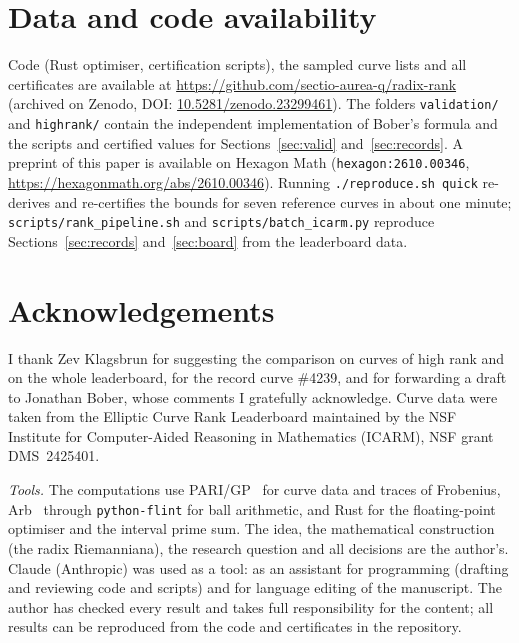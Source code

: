 \documentclass[11pt]{amsart}
\theoremstyle{remark}
\theoremstyle{definition}
\begin{document}
\section*{Data and code availability}
Code (Rust optimiser, certification scripts), the sampled curve lists and all certificates are available at \url{https://github.com/sectio-aurea-q/radix-rank} (archived on Zenodo, DOI: \href{https://doi.org/10.5281/zenodo.23299461}{10.5281/zenodo.23299461}). The folders \texttt{validation/} and \texttt{highrank/} contain the independent implementation of Bober's formula and the scripts and certified values for Sections~\ref{sec:valid} and~\ref{sec:records}. A preprint of this paper is available on Hexagon Math (\texttt{hexagon:2610.00346}, \url{https://hexagonmath.org/abs/2610.00346}). Running \texttt{./reproduce.sh quick} re-derives and re-certifies the bounds for seven reference curves in about one minute; \texttt{scripts/rank\_pipeline.sh} and \texttt{scripts/batch\_icarm.py} reproduce Sections~\ref{sec:records} and~\ref{sec:board} from the leaderboard data.

\section*{Acknowledgements}
I thank Zev Klagsbrun for suggesting the comparison on curves of high rank and on the whole leaderboard, for the record curve \#4239, and for forwarding a draft to Jonathan Bober, whose comments I gratefully acknowledge. Curve data were taken from the Elliptic Curve Rank Leaderboard maintained by the NSF Institute
for Computer-Aided Reasoning in Mathematics (ICARM), NSF grant DMS~2425401.

\medskip
\noindent\emph{Tools.} The computations use PARI/GP~\cite{PARI} for curve data and traces of
Frobenius, Arb~\cite{Arb} through \texttt{python-flint} for ball arithmetic, and Rust for the
floating-point optimiser and the interval prime sum. The idea, the mathematical construction
(the radix Riemanniana), the research question and all decisions are the author's. Claude
(Anthropic) was used as a tool: as an assistant for programming (drafting and reviewing code and
scripts) and for language editing of the manuscript. The author has checked every result and takes
full responsibility for the content; all results can be reproduced from the code and certificates
in the repository.
\end{document}
